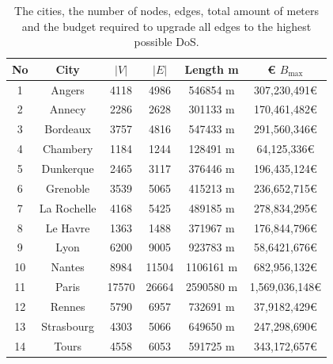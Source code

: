 \documentclass[lettersize,journal]{IEEEtran}
\begin{document}
\renewcommand{\thetable}{VI}
\begin{table}[t]
  \centering
  \vspace{0.2cm}
  \begin{tabular}{|c|c|c|c|c|c|}
    \hline
    \textbf{No} & \textbf{City} & $|V|$ & $|E|$ & Length m & € $B_{\max}$  \\
    \hline
1 & Angers & 4118 & 4986  & 546854 m & 307,230,491€ \\ 
2 & Annecy & 2286 & 2628  & 301133 m & 170,461,482€\\ 
3 & Bordeaux & 3757 & 4816  & 547433 m & 291,560,346€\\ 
4 & Chambery & 1184 & 1244  & 128491 m & 64,125,336€\\ 
5 & Dunkerque & 2465 & 3117  & 376446 m & 196,435,124€ \\ 
6 & Grenoble & 3539 & 5065  & 415213 m & 236,652,715€\\ 
7 & La Rochelle & 4168 & 5425  & 489185 m & 278,834,295€ \\ 
8 & Le Havre & 1363 & 1488  & 371967 m & 176,844,796€\\ 
9 & Lyon & 6200 & 9005  & 923783 m & 58,6421,676€ \\ 
10 & Nantes & 8984 & 11504  & 1106161 m & 682,956,132€\\ 
11 & Paris & 17570 & 26664  & 2590580 m  & 1,569,036,148€ \\ 
12 & Rennes & 5790 & 6957  & 732691 m & 37,9182,429€\\ 
13 & Strasbourg & 4303 & 5066 & 649650 m & 247,298,690€ \\ 
14 & Tours & 4558 & 6053 & 591725 m & 343,172,657€  \\ \hline
  \end{tabular}
  \caption{ \footnotesize The cities, the number of nodes, edges, total amount of meters and the budget required to upgrade all edges to the highest possible DoS.}
  \label{budget_cities}
\end{table}
\end{document}
